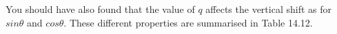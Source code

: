 You should have also found that the value of $q$ affects the vertical shift as for $sin\theta $ and $cos\theta $.
These different properties are summarised in Table 14.12.\par 
\setlength\mytablespace{6\tabcolsep}
\addtolength\mytablespace{4\arrayrulewidth}
\setlength\mytablewidth{\linewidth}
\setlength\mytableroom{\mytablewidth}
\addtolength\mytableroom{-\mytablespace}
\setlength\myfixedwidth{0pt}
\setlength\mystarwidth{\mytableroom}
\addtolength\mystarwidth{-\myfixedwidth}
\divide{}
